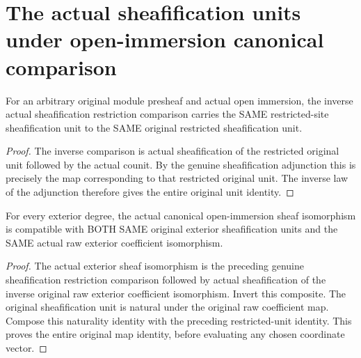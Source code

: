 \section{The actual sheafification units under open-immersion canonical comparison}

\begin{lemma}\label{sc0-open-immersion-sheaf-units:restricted}
\leanok
{}
For an arbitrary original module presheaf and actual open immersion, the inverse actual sheafification restriction comparison carries the SAME restricted-site sheafification unit to the SAME original restricted sheafification unit.
\end{lemma}
\begin{proof}
The inverse comparison is actual sheafification of the restricted original unit followed by the actual counit. By the genuine sheafification adjunction this is precisely the map corresponding to that restricted original unit. The inverse law of the adjunction therefore gives the entire original unit identity.
\end{proof}

\begin{lemma}\label{sc0-open-immersion-sheaf-units:exterior}
\leanok
{}
For every exterior degree, the actual canonical open-immersion sheaf isomorphism is compatible with BOTH SAME original exterior sheafification units and the SAME actual raw exterior coefficient isomorphism.
\end{lemma}
\begin{proof}
The actual exterior sheaf isomorphism is the preceding genuine sheafification restriction comparison followed by actual sheafification of the inverse original raw exterior coefficient isomorphism. Invert this composite. The original sheafification unit is natural under the original raw coefficient map. Compose this naturality identity with the preceding restricted-unit identity. This proves the entire original map identity, before evaluating any chosen coordinate vector.
\end{proof}

